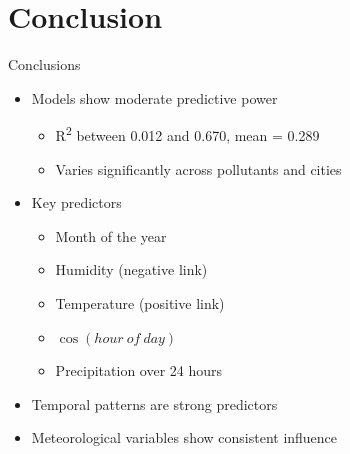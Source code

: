 \documentclass[svgnames, 12pt]{beamer}
\begin{document}

\section{Conclusion}

\begin{frame}{Conclusions}
\begin{itemize}
    \item Models show moderate predictive power
        \begin{itemize}
            \item R\textsuperscript{2} between 0.012 and 0.670, mean = 0.289
            \item Varies significantly across pollutants and cities
        \end{itemize}
    \item Key predictors
        \begin{itemize}
            \item Month of the year
            \item Humidity (negative link)
            \item Temperature (positive link)
            \item $\cos(hour\ of\ day)$
            \item Precipitation over 24 hours
        \end{itemize}
    \item Temporal patterns are strong predictors
    \item Meteorological variables show consistent influence
\end{itemize}
\end{frame}
\end{document}
